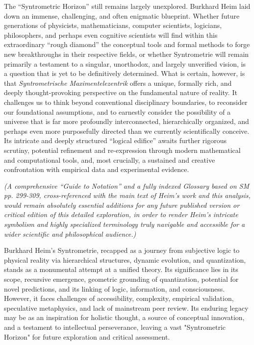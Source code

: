 \documentclass[12pt]{article}
\newcommand{\q}[1]{\enquote{#1}}
\begin{document}
The \enquote{Syntrometric Horizon} still remains largely unexplored. Burkhard Heim laid down an immense, challenging, and often enigmatic blueprint. Whether future generations of physicists, mathematicians, computer scientists, logicians, philosophers, and perhaps even cognitive scientists will find within this extraordinary \enquote{rough diamond} the conceptual tools and formal methods to forge new breakthroughs in their respective fields, or whether Syntrometrie will remain primarily a testament to a singular, unorthodox, and largely unverified vision, is a question that is yet to be definitively determined. What is certain, however, is that \textit{Syntrometrische Maximentelezentrik} offers a unique, formally rich, and deeply thought-provoking perspective on the fundamental nature of reality. It challenges us to think beyond conventional disciplinary boundaries, to reconsider our foundational assumptions, and to earnestly consider the possibility of a universe that is far more profoundly interconnected, hierarchically organized, and perhaps even more purposefully directed than we currently scientifically conceive. Its intricate and deeply structured \q{logical edifice} awaits further rigorous scrutiny, potential refinement and re-expression through modern mathematical and computational tools, and, most crucially, a sustained and creative confrontation with empirical data and experimental evidence.

\textit{(A comprehensive \enquote{Guide to Notation} and a fully indexed Glossary based on SM pp. 299-309, cross-referenced with the main text of Heim's work and this analysis, would remain absolutely essential additions for any future published version or critical edition of this detailed exploration, in order to render Heim's intricate symbolism and highly specialized terminology truly navigable and accessible for a wider scientific and philosophical audience.)}

Burkhard Heim's Syntrometrie, recapped as a journey from subjective logic to physical reality via hierarchical structures, dynamic evolution, and quantization, stands as a monumental attempt at a unified theory. Its significance lies in its scope, recursive emergence, geometric grounding of quantization, potential for novel predictions, and its linking of logic, information, and consciousness. However, it faces challenges of accessibility, complexity, empirical validation, speculative metaphysics, and lack of mainstream peer review. Its enduring legacy may be as an inspiration for holistic thought, a source of conceptual innovation, and a testament to intellectual perseverance, leaving a vast "Syntrometric Horizon" for future exploration and critical assessment.
\end{document}
